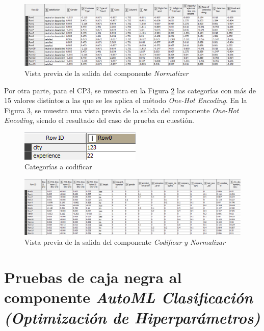 \begin{figure}[H]
	\centering
	\includegraphics[width=0.8\linewidth]{"figuras/capi 3/pruebas-jenn/norm-cp1"}
	\caption{Vista previa de la salida del componente \textit{Normalizer}}
	\label{fig:norm-cp1}
\end{figure}



Por otra parte, para el CP3, se muestra en la Figura \ref{fig:categorias-a-codificar} las categorías con más de 15 valores distintos a las que se les aplica el método \textit{One-Hot Encoding}. En la Figura \ref{fig:resultado-cp3-codif-norm}, se muestra una vista previa de la salida del componente \textit{One-Hot Encoding}, siendo el resultado del caso de prueba en cuestión. 

\begin{figure}[H]
	\centering
	\includegraphics[width=0.4\linewidth]{"figuras/capi 3/pruebas-jenn/categorias-a-codificar"}
	\caption{Categorías a codificar}
	\label{fig:categorias-a-codificar}
\end{figure}

\begin{figure}[H]
	\centering
	\includegraphics[width=0.8\linewidth]{"figuras/capi 3/pruebas-jenn/resultado-cp3-codif-norm"}
	\caption{Vista previa de la salida del componente \textit{Codificar y Normalizar}}
	\label{fig:resultado-cp3-codif-norm}
\end{figure}


\section{Pruebas de caja negra al componente \textit{AutoML Clasificación (Optimización de Hiperparámetros)}}

